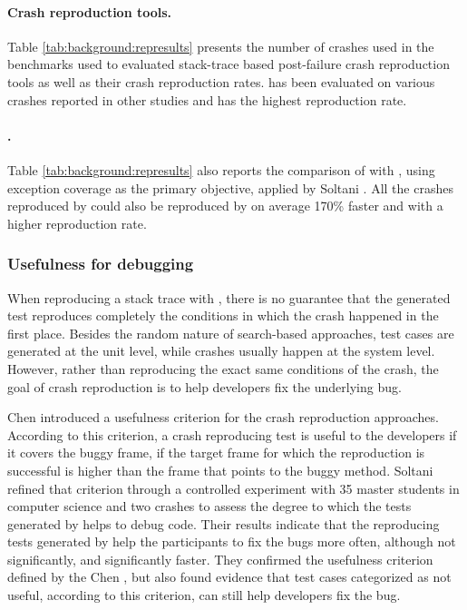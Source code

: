 \paragraph{Crash reproduction tools.}
%
Table \ref{tab:background:represults} presents the number of crashes used in the benchmarks used to evaluated stack-trace based post-failure crash reproduction tools as well as their crash reproduction rates. 
\evocrash has been evaluated on various crashes reported in other studies and has the highest reproduction rate.


\paragraph{\evosuite{}.}
%
Table \ref{tab:background:represults} also reports the comparison of \evocrash with \evosuite, using exception coverage as the primary objective, applied by Soltani \etal \cite{Soltani2018a}. All the crashes reproduced by \evosuite could also be reproduced by \evocrash on average 170\% faster and with a higher reproduction rate. 


\subsubsection{Usefulness for debugging}

When reproducing a stack trace with \evocrash, there is no guarantee that the generated test reproduces completely the conditions in which the crash happened in the first place. Besides the random nature of search-based approaches, test cases are generated at the unit level, while crashes usually happen at the system level. However, rather than reproducing the exact same conditions of the crash, the goal of crash reproduction is to help developers fix the underlying bug.

Chen \etal \cite{Chen2015} introduced a usefulness criterion for the crash reproduction approaches. 
According to this criterion, a crash reproducing test is useful to the developers if it covers the buggy frame, \ie if the target frame for which the reproduction is successful is higher than the frame that points to the buggy method.
Soltani \etal \cite{Soltani2018a} refined that criterion through a controlled experiment with 35 master students in computer science and two crashes to assess the degree to which the tests generated by \evocrash helps to debug code. 
Their results indicate that the reproducing tests generated by \evocrash help the participants to fix the bugs more often, although not significantly, and significantly faster. 
They confirmed the usefulness criterion defined by the Chen \etal \cite{Chen2015}, but also found evidence that test cases categorized as not useful, according to this criterion, can still help developers fix the bug.


